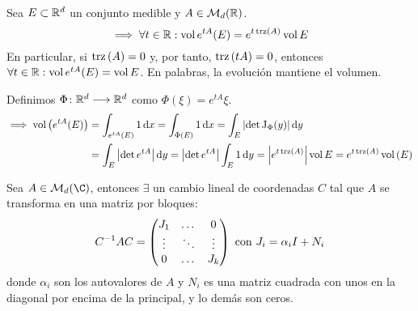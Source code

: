 \begin{cor}[Liouville]
	Sea $E \subset \mathbb{R}^d$ un conjunto medible y $A \in \mathcal{M}_d(\mathbb{R})$.
	\[\implies \forall t \in \mathbb{R} : \operatorname{vol}{e^{tA}(E)} = e^{t\operatorname{trz}\left(A\right)} \operatorname{vol}{E}\]
	En particular, si $\operatorname{trz}\left(A\right) =0$ y, por tanto, $\operatorname{trz}\left(tA\right) = 0$, entonces $\forall t \in \mathbb{R} : \operatorname{vol}{e^{tA}(E)} = \operatorname{vol}{E}$. En palabras, la evolución mantiene el volumen.
	\begin{dem}
		Definimos $\Phi \colon \mathbb{R}^d \longrightarrow \mathbb{R}^d$ como $\Phi(\xi) = e^{tA}\xi$.
		\[\begin{aligned}
				\implies \vol{\left(e^{tA} (E)\right)} & = \int_{e^{tA}(E)} 1 \odif{x} = \int_{\Phi(E)} 1 \odif{x} = \int_{E} \left|\det{\operatorname{J}_\Phi(y)}\right| \odif{y}                    \\
				                                       & = \int_{E} \left|\det{e^{tA}}\right| \odif{y} = \abs{\det{e^{tA}}} \int_{E} 1 \odif{y} = \abs{e^{t\trz{A}}} \vol{E} = e^{t\trz{A}} \vol{(E)}
			\end{aligned}\]
	\end{dem}
\end{cor}

\begin{teo}
	Sea $A \in \mathcal{M}_d(\C)$, entonces $\exists$ un cambio lineal de coordenadas $C$ tal que $A$ se transforma en una matriz por bloques:
	\[C^{-1} A C = \begin{pmatrix}
			J_1    & \dots  & 0      \\
			\vdots & \ddots & \vdots \\
			0      & \dots  & J_k
		\end{pmatrix} \text{ con } J_i = \alpha_i I + N_i\]
	donde $\alpha_i$ son los autovalores de $A$ y $N_i$ es una matriz cuadrada con unos en la diagonal por encima de la principal, y lo demás son ceros.
\end{teo}

